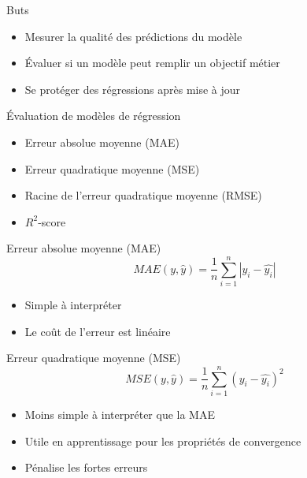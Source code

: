 \begin{frame}{Buts}
  \begin{itemize}[<+->]
    \item Mesurer la qualité des prédictions du modèle
    \item Évaluer si un modèle peut remplir un objectif métier
    \item Se protéger des régressions après mise à jour
  \end{itemize}
\end{frame}

\begin{frame}{Évaluation de modèles de régression}
  \begin{itemize}
    \item Erreur absolue moyenne (MAE)
    \item Erreur quadratique moyenne (MSE)
    \item Racine de l'erreur quadratique moyenne (RMSE)
    \item $R^2$-score
  \end{itemize}
\end{frame}

\begin{frame}{Erreur absolue moyenne (MAE)}
  \begin{equation*}
    MAE(y,\hat{y})=\frac{1}{n}\sum^n_{i=1}|y_i-\hat{y_i}|
  \end{equation*}

  \begin{itemize}
    \item Simple à interpréter
    \item Le coût de l'erreur est linéaire
  \end{itemize}
\end{frame}

\begin{frame}{Erreur quadratique moyenne (MSE)}
  \begin{equation*}
    MSE(y,\hat{y})=\frac{1}{n}\sum^n_{i=1}(y_i-\hat{y_i})^2
  \end{equation*}

  \begin{itemize}
    \item Moins simple à interpréter que la MAE
    \item Utile en apprentissage pour les propriétés de convergence
    \item Pénalise les fortes erreurs
  \end{itemize}
\end{frame}

